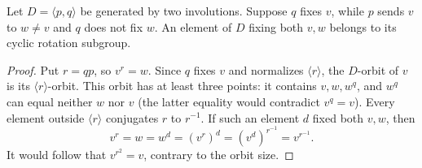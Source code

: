 \documentclass[a4paper,11pt]{article}
\newcommand{\gen}[1]{\langle#1\rangle}
\begin{document}
\begin{lemma}\label{reflection}
Let $D=\gen{p,q}$ be generated by two involutions. Suppose $q$ fixes
$v$, while $p$ sends $v$ to $w\ne v$ and $q$ does not fix $w$.
An element of $D$ fixing both $v,w$ belongs to its cyclic rotation
subgroup.
\end{lemma}
\begin{proof}
Put $r=qp$, so $v^r=w$. Since $q$ fixes $v$ and normalizes $\gen r$,
the $D$-orbit of $v$ is its $\gen r$-orbit. This orbit has at least three
points: it contains $v,w,w^q$, and $w^q$ can equal neither $w$ nor $v$
(the latter equality would contradict $v^q=v$). Every element outside
$\gen r$ conjugates $r$ to $r^{-1}$. If such an element $d$ fixed both
$v,w$, then
\[
 v^r=w=w^d=(v^r)^d=(v^d)^{r^{-1}}=v^{r^{-1}}.
\]
It would follow that $v^{r^2}=v$, contrary to the orbit size.
\end{proof}
\end{document}

